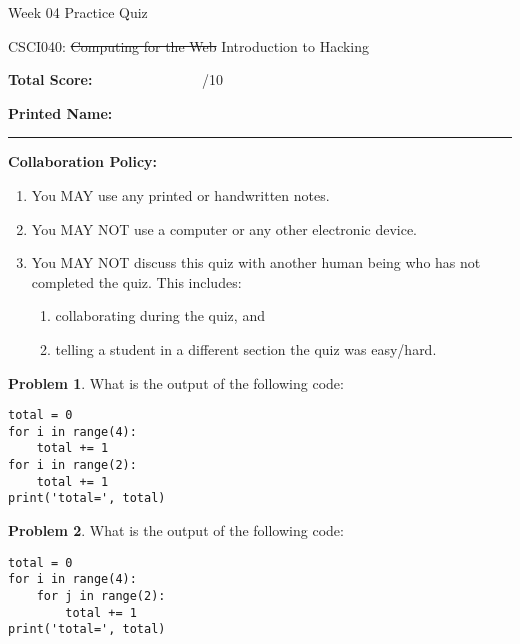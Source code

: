 \documentclass[10pt]{article}
\theoremstyle{definition}
\newtheorem{problem}{Problem}
\begin{document}
\begin{center}
    {
\Large
Week 04 Practice Quiz
}

    \vspace{0.1in}
    CSCI040: \sout{Computing for the Web} Introduction to Hacking

    \vspace{0.1in}
\end{center}


\vspace{0.15in}
\noindent
\textbf{Total Score:} ~~~~~~~~~~~~~~~/10

\vspace{0.5in}
\noindent
\textbf{Printed Name:}

\noindent
\rule{\textwidth}{0.1pt}
\vspace{0.25in}

\noindent
\textbf{Collaboration Policy:}
\begin{enumerate}
    \item You MAY use any printed or handwritten notes.
    \item You MAY NOT use a computer or any other electronic device.
    \item You MAY NOT discuss this quiz with another human being who has not completed the quiz.
        This includes:
        \begin{enumerate}
            \item collaborating during the quiz, and
            \item telling a student in a different section the quiz was easy/hard.
        \end{enumerate}
\end{enumerate}

\vspace{0.15in}

\begin{problem}
    What is the output of the following code:
\end{problem}
\begin{lstlisting}
total = 0
for i in range(4):
    total += 1
for i in range(2):
    total += 1
print('total=', total)
\end{lstlisting}
\vspace{1in}

\begin{problem}
    What is the output of the following code:
\end{problem}
\begin{lstlisting}
total = 0
for i in range(4):
    for j in range(2):
        total += 1
print('total=', total)
\end{lstlisting}
\vspace{1.5in}
\end{document}
